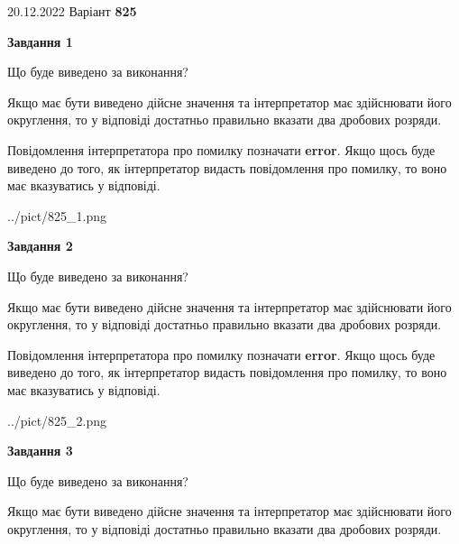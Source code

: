 \documentclass[12pt, ukrainian]{article}
\begin{document}
{20.12.2022 Варіант \No \textbf { 825 }\par}
{
\begin {Large}

{\begin {center}\textbf{Завдання 1}\end {center}}\par
Що буде виведено за виконання? \par

Якщо має бути виведено дійсне значення та інтерпретатор має здійснювати його округлення, 
то у відповіді достатньо правильно вказати два дробових розряди.

Повідомлення інтерпретатора про помилку позначати \textbf{error}.
Якщо щось буде виведено до того, як інтерпретатор видасть повідомлення про помилку, 
то воно має вказуватись у відповіді. \par

\begin{center}
	{../pict/825_1.png}
\end{center}
\newpage

{\begin {center}\textbf{Завдання 2}\end {center}}\par
Що буде виведено за виконання? \par

Якщо має бути виведено дійсне значення та інтерпретатор має здійснювати його округлення, 
то у відповіді достатньо правильно вказати два дробових розряди.

Повідомлення інтерпретатора про помилку позначати \textbf{error}.
Якщо щось буде виведено до того, як інтерпретатор видасть повідомлення про помилку, 
то воно має вказуватись у відповіді. \par

\begin{center}
	{../pict/825_2.png}
\end{center}
\newpage

{\begin {center}\textbf{Завдання 3}\end {center}}\par
Що буде виведено за виконання? \par

Якщо має бути виведено дійсне значення та інтерпретатор має здійснювати його округлення, 
то у відповіді достатньо правильно вказати два дробових розряди.


\end{Large}}
\end{document}
